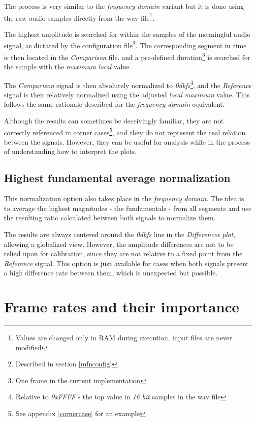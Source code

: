 \documentclass[10pt,a4paper]{report}
\newcommand{\db}[1]{\textit{#1\acrshort{dbfs}}}
\begin{document}
\begin{appendices}
The process is very similar to the \textit{frequency domain} variant but it is done using the raw audio samples directly from the \acrshort{wav} file\footnote{Values are changed only in RAM during execution, input files are never modified}.

The highest amplitude is searched for within the samples of the meaningful audio signal, as dictated by the configuration file\footnote{Described in section \ref{mfnconfig}}. The corresponding segment in time is then located in the \textit{Comparison} file, and a pre-defined duration\footnote{One frame in the current implementation} is searched for the sample with the \textit{maximum local} value.

The \textit{Comparison} signal is then absolutely normalized to \db{0}\footnote{Relative to \textit{0xFFFF} - the top value in \textit{16 bit} samples in the \acrshort{wav} file}, and the \textit{Reference} signal is then relatively normalized using the adjusted \textit{local maximum} value. This follows the same rationale described for the \textit{frequency domain} equivalent.

Although the results can sometimes be deceivingly familiar, they are not correctly referenced in corner cases\footnote{See appendix \ref{cornercase} for an example}, and they do not represent the real relation between the signals. However, they can be useful for analysis while in the process of understanding how to interpret the plots.

\section{Highest fundamental average normalization}

This normalization option also takes place in the \textit{frequency domain}. The idea is to average the highest magnitudes - the fundamentals - from all segments and use the resulting ratio calculated between both signals to normalize them.

The results are always centered around the \db{0} line in the \textit{Differences plot}, allowing a globalized view. However, the amplitude differences are not to be relied upon for calibration, since they are not relative to a fixed point from the \textit{Reference} signal. This option is just available for cases when both signals present a high difference rate between them, which is unexpected but possible.

\chapter{Frame rates and their importance}
\label{framerate}


\end{appendices}
\end{document}
